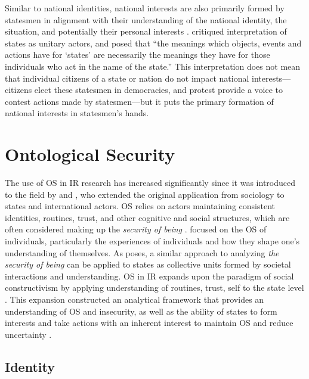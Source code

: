 Similar to national identities, national interests are also primarily formed by statesmen in alignment with their understanding of the national identity, the situation, and potentially their personal interests \citep[pg.~280-282]{weldes1996}. \citet[pg.~280]{weldes1996} critiqued  interpretation of states as unitary actors, and posed that ``the meanings which objects, events and actions have for `states' are necessarily the meanings they have for those individuals who act in the name of the state.'' This interpretation does not mean that individual citizens of a state or nation do not impact national interests---citizens elect these statesmen in democracies, and protest provide a voice to contest actions made by statesmen---but it puts the primary formation of national interests in statesmen's hands.


\section{Ontological Security}
\label{sec:ontological_security}

The use of \ac{OS} in \ac{IR} research has increased significantly since it was introduced to the field by \citet{kinnvall2004} and \citet{mitzenOntologicalSecurityWorld2006}, who extended the original application from sociology \citep{giddens1991} to states and international actors. \ac{OS} relies on actors maintaining consistent identities, routines, trust, and other cognitive and social structures, which are often considered making up the \textit{security of being} \citep[pg.~240]{kinnvall2020a}. \citet{giddens1991} focused on the \ac{OS} of individuals, particularly the experiences of individuals and how they shape one's understanding of themselves. As \citet[pg.~352]{mitzenOntologicalSecurityWorld2006} poses, a similar approach to analyzing \textit{the security of being} can be applied to states as collective units formed by societal interactions and understanding. \ac{OS} in \ac{IR} expands upon the paradigm of social constructivism by applying  understanding of routines, trust, self to the state level \citep{mitzenOntologicalSecurityWorld2006, kinnvall2004}. This expansion constructed an analytical framework that provides an understanding of \ac{OS} and insecurity, as well as the ability of states to form interests and take actions with an inherent interest to maintain \ac{OS} and reduce uncertainty \citep{mitzenOntologicalSecurityWorld2006,kinnvall2004}.

\subsection{Identity}
\label{subsec:ont_identity}

